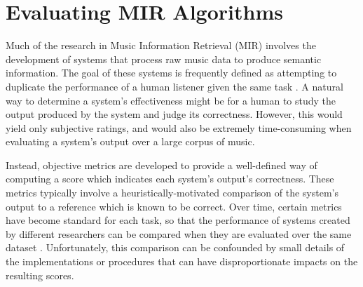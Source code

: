 \documentclass{article}
\title{\mireval{}}
\def\mireval{\texttt{mir\char`_eval}}
\begin{document}
%
\maketitle
%
\begin{abstract}
Central to the field of MIR research is the evaluation of algorithms used to extract information from music data.
We present \mireval{}, an open source software library which provides a transparent and easy-to-use implementation of the most common metrics used to measure the performance of MIR algorithms.
In the present work, we enumerate the metrics implemented by \mireval{} and quantitatively compare each to an existing implementation.
When the score reported by \mireval{} differs substantially from the reference, we detail the differences in implementation.
We also provide a brief overview of \mireval{}'s architecture, design, and intended use.
\end{abstract}
%
\section{Evaluating MIR Algorithms}

Much of the research in Music Information Retrieval (MIR) involves the development of systems that process raw music data to produce semantic information.
The goal of these systems is frequently defined as attempting to duplicate the performance of a human listener given the same task \cite{downie2003toward}.
A natural way to determine a system's effectiveness might be for a human to study the output produced by the system and judge its correctness.
However, this would yield only subjective ratings, and would also be extremely time-consuming when evaluating a system's output over a large corpus of music.

Instead, objective metrics are developed to provide a well-defined way of computing a score which indicates each system's output's correctness.
These metrics typically involve a heuristically-motivated comparison of the system's output to a reference which is known to be correct.
Over time, certain metrics have become standard for each task, so that the performance of systems created by different researchers can be compared when they are evaluated over the same dataset \cite{downie2003toward}.
Unfortunately, this comparison can be confounded by small details of the implementations or procedures that can have disproportionate impacts on the resulting scores.
\end{document}
